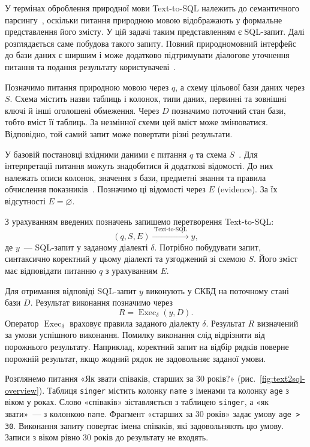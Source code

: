 \documentclass[a4paper,14pt,oneside]{extreport}
\begin{document}
У термінах оброблення природної мови Text-to-SQL належить до семантичного парсингу~\cite{yu2018spider}, оскільки питання природною мовою відображають у формальне представлення його змісту. У цій задачі таким представленням є SQL-запит. Далі розглядається саме побудова такого запиту. Повний природномовний інтерфейс до бази даних є ширшим і може додатково підтримувати діалогове уточнення питання та подання результату користувачеві~\cite{yu2019cosql}.

Позначимо питання природною мовою через \(q\), а схему цільової бази даних через \(S\). Схема містить назви таблиць і колонок, типи даних, первинні та зовнішні ключі й інші оголошені обмеження. Через \(D\) позначимо поточний стан бази, тобто вміст її таблиць. За незмінної схеми цей вміст може змінюватися. Відповідно, той самий запит може повертати різні результати.

У базовій постановці вхідними даними є питання \(q\) та схема \(S\)~\cite{yu2018spider}. Для інтерпретації питання можуть знадобитися й додаткові відомості. До них належать описи колонок, значення з бази, предметні знання та правила обчислення показників~\cite{li2023bird}. Позначимо ці відомості через \(E\) (evidence). За їх відсутності \(E=\varnothing\).

З урахуванням введених позначень запишемо перетворення Text-to-SQL:
\begin{equation}
\label{eq:text2sql-task}
(q,S,E)\xrightarrow{\;\mathrm{Text\text{-}to\text{-}SQL}\;}y,
\end{equation}
де \(y\)~--- SQL-запит у заданому діалекті \(\delta\). Потрібно побудувати запит, синтаксично коректний у цьому діалекті та узгоджений зі схемою \(S\). Його зміст має відповідати питанню \(q\) з урахуванням \(E\).

Для отримання відповіді SQL-запит \(y\) виконують у СКБД на поточному стані бази \(D\). Результат виконання позначимо через
\begin{equation}
\label{eq:text2sql-execution}
R=\operatorname{Exec}_{\delta}(y,D).
\end{equation}
Оператор \(\operatorname{Exec}_{\delta}\) враховує правила заданого діалекту \(\delta\). Результат \(R\) визначений за умови успішного виконання. Помилку виконання слід відрізняти від порожнього результату. Наприклад, коректний запит на відбір рядків поверне порожній результат, якщо жодний рядок не задовольняє заданої умови.

Розглянемо питання «Як звати співаків, старших за 30 років?» (рис.~\ref{fig:text2sql-overview}). Таблиця \texttt{singer} містить колонку \texttt{name} з іменами та колонку \texttt{age} з віком у роках. Слово «співаків» зіставляється з таблицею \texttt{singer}, а «як звати»~--- з колонкою \texttt{name}. Фрагмент «старших за 30 років» задає умову \texttt{age > 30}. Виконання запиту повертає імена співаків, які задовольняють цю умову. Записи з віком рівно 30 років до результату не входять.
\end{document}
